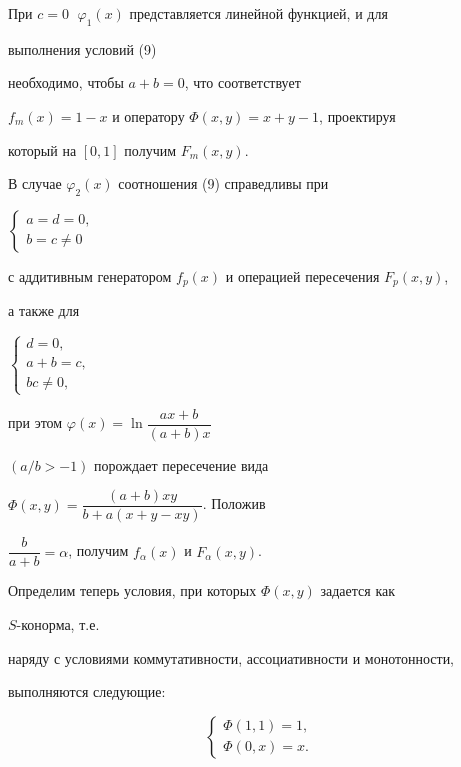 При $c=0\;$ $\varphi_1(x)$ представляется линейной функцией, и для


выполнения условий (9)


необходимо, чтобы $a+b=0$, что соответствует


$f_m(x)=1-x$ и оператору $\Phi(x,y)=x+y-1$, проектируя


который на $[0,1]$ получим $F_m(x,y)$.





В случае $\varphi_2(x)$ соотношения (9) справедливы при


$


\begin{cases}


a=d=0,\\


b=c\ne 0


\end{cases}


$


с аддитивным генератором $f_p(x)$ и операцией пересечения $F_p(x,y)$,


а также для


$


\begin{cases}


d=0,\\


a+b=c,\\


bc\ne 0,


\end{cases}


$


при этом $\varphi(x)=\ln\dfrac{ax+b}{(a+b)x}$


$(a/b>-1)$ порождает пересечение вида


$\Phi(x,y)=\dfrac{(a+b)xy}{b+a(x+y-xy)}$. Положив


$\dfrac{b}{a+b}=\alpha$, получим $f_\alpha(x)$ и $F_\alpha(x,y)$.





Определим теперь условия, при которых $\Phi(x,y)$ задается как


$S$-конорма, т.е.


наряду с условиями коммутативности, ассоциативности и монотонности,


выполняются следующие:


\begin{equation}


\begin{cases}


\Phi(1,1)=1,\\


\Phi(0,x)=x.


\end{cases}


\end{equation}






